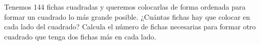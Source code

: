 \documentclass[addpoints,spanish, 12pt,a4paper]{exam}
\renewcommand*\half{.5}
\begin{document}
\begin{questions}
\begin{multicols}{2}
\end{multicols}


    
    
    

\question[2] Tenemos 144 fichas cuadradas y queremos colocarlas de forma ordenada para formar un cuadrado lo más grande posible. ¿Cuántas fichas hay que colocar en cada lado del cuadrado? Calcula el número de fichas necesarias para formar otro cuadrado que tenga dos fichas más en cada lado.\vspace{120pt}

    
    

\end{questions}
\end{document}
